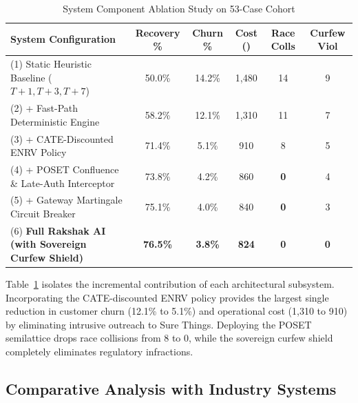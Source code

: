 \documentclass[10pt, twocolumn, a4paper]{article}
\newcommand{\INR}{\text{INR~}}
\begin{document}
\begin{table}[t]
\centering
\small
\caption{System Component Ablation Study on 53-Case Cohort}
\label{tab:ablation}
\begin{tabularx}{\textwidth}{Xccccc}
\toprule
\textbf{System Configuration} & \textbf{Recovery \%} & \textbf{Churn \%} & \textbf{Cost (\INR)} & \textbf{Race Colls} & \textbf{Curfew Viol} \\
\midrule
(1) Static Heuristic Baseline ($T+1, T+3, T+7$) & 50.0\% & 14.2\% & \INR 1,480 & 14 & 9 \\
(2) + Fast-Path Deterministic Engine & 58.2\% & 12.1\% & \INR 1,310 & 11 & 7 \\
(3) + CATE-Discounted ENRV Policy & 71.4\% & 5.1\% & \INR 910 & 8 & 5 \\
(4) + POSET Confluence \& Late-Auth Interceptor & 73.8\% & 4.2\% & \INR 860 & \textbf{0} & 4 \\
(5) + Gateway Martingale Circuit Breaker & 75.1\% & 4.0\% & \INR 840 & \textbf{0} & 3 \\
(6) \textbf{Full Rakshak AI (with Sovereign Curfew Shield)} & \textbf{76.5\%} & \textbf{3.8\%} & \textbf{\INR 824} & \textbf{0} & \textbf{0} \\
\bottomrule
\end{tabularx}
\end{table}

Table~\ref{tab:ablation} isolates the incremental contribution of each architectural subsystem. Incorporating the CATE-discounted ENRV policy provides the largest single reduction in customer churn (12.1\% to 5.1\%) and operational cost (\INR 1,310 to \INR 910) by eliminating intrusive outreach to Sure Things. Deploying the POSET semilattice drops race collisions from 8 to 0, while the sovereign curfew shield completely eliminates regulatory infractions.

\subsection{Comparative Analysis with Industry Systems}
\end{document}
